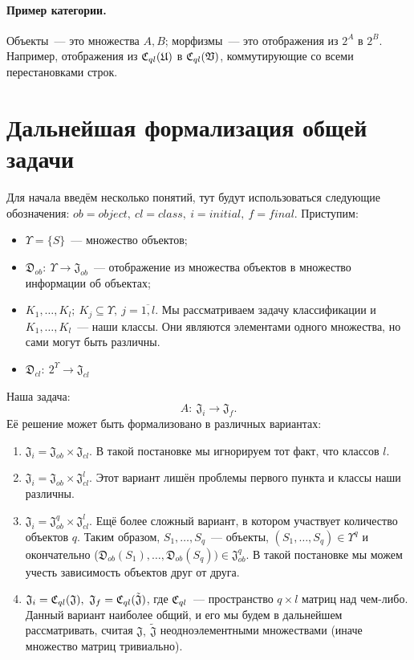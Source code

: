 \documentclass[a4paper, 12pt]{report}
\begin{document}
\paragraph{Пример категории.} Объекты~--- это множества $A, B$; морфизмы~--- это отображения из $2^A$ в $2^B$. Например, отображения из $\mathfrak{C}_{ql}(\mathfrak{U})$ в $\mathfrak{C}_{ql}(\mathfrak{V})$, коммутирующие со всеми перестановками строк.


\section{Дальнейшая формализация общей задачи}
Для начала введём несколько понятий, тут будут использоваться следующие обозначения: $ob = object,\ cl=class,\ i=initial,\ f=final$.
Приступим:
\begin{itemize}
  \item $\Upsilon=\{S\}$~--- множество объектов;
  \item $\mathfrak{D}_{ob}:\ \Upsilon\rightarrow\mathfrak{J}_{ob}$~--- отображение из множества объектов в множество информации об объектах;
  \item $K_1,\ldots,K_l;\ K_j \subseteq \Upsilon,\ j=\overline{1,l}$. Мы рассматриваем задачу классификации и $K_1,\ldots,K_l$~--- наши классы. Они являются элементами одного множества, но сами могут быть различны.
  \item $\mathfrak{D}_{cl}:\ 2^{\Upsilon}\rightarrow\mathfrak{J}_{cl}$
\end{itemize}
Наша задача:
\[
A:\ \mathfrak{J}_i \rightarrow \mathfrak{J}_f.
\]
Её решение может быть формализовано в различных вариантах:
\begin{enumerate}
  \item $\mathfrak{J}_i = \mathfrak{J}_{ob}\times\mathfrak{J}_{cl}$. В такой постановке мы игнорируем тот факт, что классов $l$.
  \item $\mathfrak{J}_i = \mathfrak{J}_{ob}\times\mathfrak{J}_{cl}^l$. Этот вариант лишён проблемы первого пункта и классы наши различны.
  \item $\mathfrak{J}_i = \mathfrak{J}_{ob}^q\times\mathfrak{J}_{cl}^l$. Ещё более сложный вариант, в котором участвует количество объектов $q$. Таким образом, $S_1,\ldots,S_q$~--- объекты, $(S_1,\ldots,S_q)\in\Upsilon^q$ и окончательно ($\mathfrak{D}_{ob}(S_1), \ldots, \mathfrak{D}_{ob}(S_q)) \in \mathfrak{J}_{ob}^q$. В такой постановке мы можем учесть зависимость объектов друг от друга.
  \item $\mathfrak{J}_i = \Cql(\mathfrak{J}),\ \mathfrak{J}_f = \Cql(\tilde{\mathfrak{J}})$, где $\mathfrak{C}_{ql}$~--- пространство $q\times l$ матриц над чем-либо. Данный вариант наиболее общий, и его мы будем в дальнейшем рассматривать, считая $\mathfrak{J},\ \tilde{\mathfrak{J}}$ неодноэлементными множествами (иначе множество матриц тривиально).
\end{enumerate}
\end{document}
